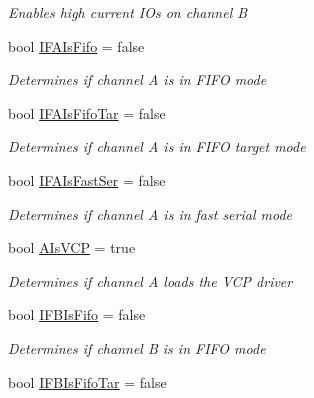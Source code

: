 \begin{DoxyCompactItemize}
\begin{DoxyCompactList}\small\item\em Enables high current I\+Os on channel B \end{DoxyCompactList}\item 
bool \mbox{\hyperlink{class_f_t_d2_x_x___n_e_t_1_1_f_t_d_i_1_1_f_t2232___e_e_p_r_o_m___s_t_r_u_c_t_u_r_e_acf4f1773141c05e17300ba4327270046}{I\+F\+A\+Is\+Fifo}} = false
\begin{DoxyCompactList}\small\item\em Determines if channel A is in F\+I\+FO mode \end{DoxyCompactList}\item 
bool \mbox{\hyperlink{class_f_t_d2_x_x___n_e_t_1_1_f_t_d_i_1_1_f_t2232___e_e_p_r_o_m___s_t_r_u_c_t_u_r_e_a8299874c1b9ec921d8b4c158f5b12263}{I\+F\+A\+Is\+Fifo\+Tar}} = false
\begin{DoxyCompactList}\small\item\em Determines if channel A is in F\+I\+FO target mode \end{DoxyCompactList}\item 
bool \mbox{\hyperlink{class_f_t_d2_x_x___n_e_t_1_1_f_t_d_i_1_1_f_t2232___e_e_p_r_o_m___s_t_r_u_c_t_u_r_e_a959ec47cbc5ec1797c22fe5c95ccf92b}{I\+F\+A\+Is\+Fast\+Ser}} = false
\begin{DoxyCompactList}\small\item\em Determines if channel A is in fast serial mode \end{DoxyCompactList}\item 
bool \mbox{\hyperlink{class_f_t_d2_x_x___n_e_t_1_1_f_t_d_i_1_1_f_t2232___e_e_p_r_o_m___s_t_r_u_c_t_u_r_e_a3e15fd5bcb41cf747079570896c4f3c3}{A\+Is\+V\+CP}} = true
\begin{DoxyCompactList}\small\item\em Determines if channel A loads the V\+CP driver \end{DoxyCompactList}\item 
bool \mbox{\hyperlink{class_f_t_d2_x_x___n_e_t_1_1_f_t_d_i_1_1_f_t2232___e_e_p_r_o_m___s_t_r_u_c_t_u_r_e_a9098faaa88ff1536a0a35bc02e1bbead}{I\+F\+B\+Is\+Fifo}} = false
\begin{DoxyCompactList}\small\item\em Determines if channel B is in F\+I\+FO mode \end{DoxyCompactList}\item 
bool \mbox{\hyperlink{class_f_t_d2_x_x___n_e_t_1_1_f_t_d_i_1_1_f_t2232___e_e_p_r_o_m___s_t_r_u_c_t_u_r_e_a28f7319364166b3bdc04a50c7b8413c0}{I\+F\+B\+Is\+Fifo\+Tar}} = false

\end{DoxyCompactItemize}
